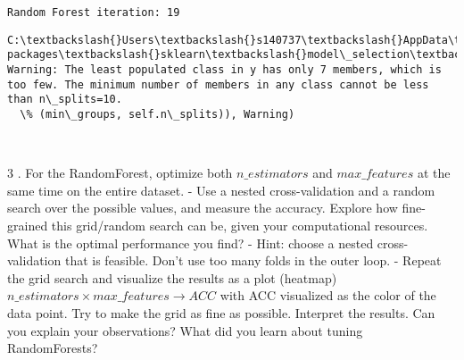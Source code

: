\documentclass[11pt]{article}
\begin{document}
    \begin{Verbatim}[commandchars=\\\{\}]
Random Forest iteration: 19 

    \end{Verbatim}

    \begin{Verbatim}[commandchars=\\\{\}]
C:\textbackslash{}Users\textbackslash{}s140737\textbackslash{}AppData\textbackslash{}Local\textbackslash{}Continuum\textbackslash{}anaconda3\textbackslash{}lib\textbackslash{}site-packages\textbackslash{}sklearn\textbackslash{}model\_selection\textbackslash{}\_split.py:605: Warning: The least populated class in y has only 7 members, which is too few. The minimum number of members in any class cannot be less than n\_splits=10.
  \% (min\_groups, self.n\_splits)), Warning)

    \end{Verbatim}

    \begin{center}
    \end{center}
    { \hspace*{\fill} \\}
    
    3 . For the RandomForest, optimize both \(n\_estimators\) and
\(max\_features\) at the same time on the entire dataset. - Use a nested
cross-validation and a random search over the possible values, and
measure the accuracy. Explore how fine-grained this grid/random search
can be, given your computational resources. What is the optimal
performance you find? - Hint: choose a nested cross-validation that is
feasible. Don't use too many folds in the outer loop. - Repeat the grid
search and visualize the results as a plot (heatmap)
\(n\_estimators \times max\_features \rightarrow ACC\) with ACC
visualized as the color of the data point. Try to make the grid as fine
as possible. Interpret the results. Can you explain your observations?
What did you learn about tuning RandomForests?
\end{document}
